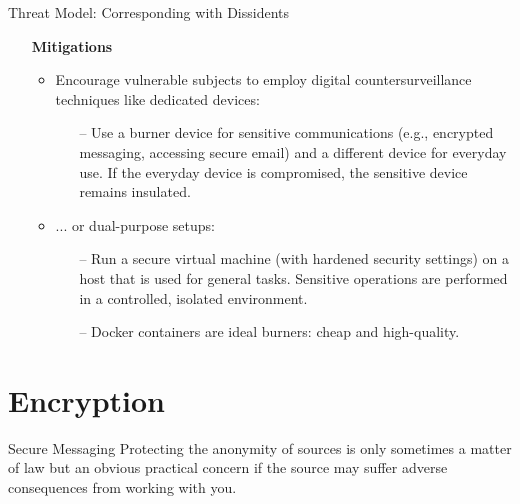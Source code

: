 \documentclass[aspectratio=169]{beamer}
\renewcommand{\emph}[1]{{\color{magenta}#1}}
\begin{document}
\begin{frame}{Threat Model: Corresponding with Dissidents}
  \begin{itemize}
    \item[] \textbf{Mitigations}
      \begin{itemize}
        \item Encourage vulnerable subjects to employ digital countersurveillance techniques like \emph{dedicated devices}:
        \begin{itemize}
\item[--] Use a \emph{burner} device for sensitive communications (e.g., encrypted messaging, accessing secure email) and a different device for everyday use. If the everyday device is compromised, the sensitive device remains insulated.
        \end{itemize}
        \item ... or \emph{dual-purpose setups}:
        \begin{itemize}
\item[--] Run a secure \emph{virtual machine} (with hardened security settings) on a host that is used for general tasks. Sensitive operations are performed in a controlled, isolated environment.
\item[--] \emph{Docker containers} are ideal burners: cheap and high-quality.
        \end{itemize}
      \end{itemize}
  \end{itemize}
  
  
\end{frame}



\section{Encryption}

\begin{frame}{Secure Messaging}\pause
  Protecting the anonymity of sources is only sometimes a matter of law but an obvious practical concern if the source may suffer adverse consequences from working with you.
\end{frame}
\end{document}
